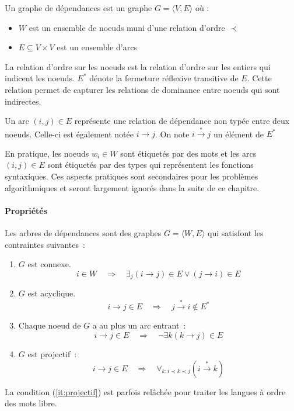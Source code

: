 \documentclass[11pt,openany]{book}
\begin{document}
Un graphe de dépendances est un graphe $G = \langle V,E \rangle $
où :
\begin{itemize}
\item $W$ est un ensemble de noeuds muni d'une relation d'ordre $\prec$
\item $E \subseteq V\times V$  est un ensemble d'arcs 
\end{itemize}

La relation d'ordre sur les noeuds est la relation d'ordre sur les
entiers qui indicent les noeuds.
$E^*$ dénote la fermeture réflexive transitive de $E$. Cette relation
permet de capturer les relations de dominance entre noeuds qui sont indirectes.

Un arc $(i,j) \in E$ représente une relation de dépendance non typée entre
deux noeuds. Celle-ci est
également notée $i \rightarrow j$. 
On note $i\stackrel{*}{\rightarrow} j$ un élément de $E^*$

En pratique, les noeuds $w_i \in W$ sont étiquetés par des mots et les
arcs $(i,j) \in E$ sont étiquetés par des types qui représentent les
fonctions syntaxiques. Ces aspects pratiques sont secondaires pour les
problèmes algorithmiques et seront largement ignorés dans la suite de ce chapitre.


\paragraph{Propriétés}
Les arbres de dépendances sont des graphes $G = \langle W,E \rangle$ qui satisfont les
contraintes suivantes~:
\begin{enumerate}
\item $G$ est connexe. 
\begin{displaymath}
 i\in W \quad\Rightarrow\quad \exists_j (i \rightarrow j) \in E \lor
  (j\rightarrow i) \in E
\end{displaymath}
\item $G$ est acyclique. 
\begin{displaymath}
i \rightarrow j\in E \quad\Rightarrow\quad 
  j \stackrel{*}{\rightarrow} i \not \in E^*
\end{displaymath}
\item Chaque  noeud de $G$  a au plus un arc entrant~: 
\begin{displaymath}
i\rightarrow j  \in E \quad\Rightarrow\quad \lnot \exists k  (k\rightarrow j)\in E
\end{displaymath}
\item\label{it:projectif} $G$ est projectif~: 
\begin{displaymath}
 i\rightarrow j \in E \quad\Rightarrow\quad 
\forall_{k:i \prec k \prec j}  (i\stackrel{*}{\rightarrow} k)
\end{displaymath}
\end{enumerate}
La condition (\ref{it:projectif}) est parfois relâchée pour traiter
les langues à ordre des mots libre.
\end{document}
